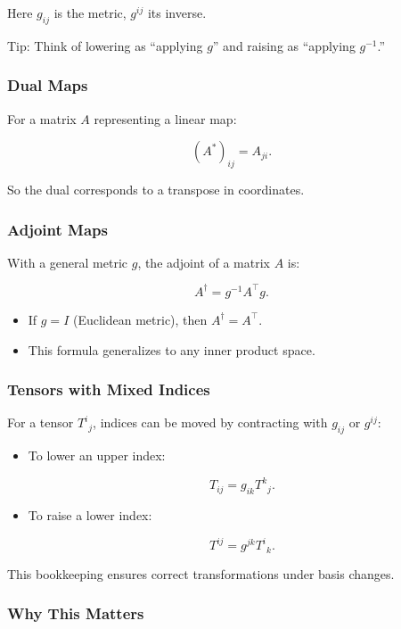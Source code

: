 \documentclass[
  letterpaper,
  DIV=11,
  numbers=noendperiod]{scrreprt}
\providecommand{\tightlist}{%
  \setlength{\itemsep}{0pt}\setlength{\parskip}{0pt}}
\begin{document}
Here \(g_{ij}\) is the metric, \(g^{ij}\) its inverse.

Tip: Think of lowering as ``applying \(g\)'' and raising as ``applying
\(g^{-1}\).''

\subsubsection{Dual Maps}\label{dual-maps}

For a matrix \(A\) representing a linear map:

\[
(A^*)_{ij} = A_{ji}.
\]

So the dual corresponds to a transpose in coordinates.

\subsubsection{Adjoint Maps}\label{adjoint-maps}

With a general metric \(g\), the adjoint of a matrix \(A\) is:

\[
A^\dagger = g^{-1} A^\top g.
\]

\begin{itemize}
\tightlist
\item
  If \(g = I\) (Euclidean metric), then \(A^\dagger = A^\top\).
\item
  This formula generalizes to any inner product space.
\end{itemize}

\subsubsection{Tensors with Mixed
Indices}\label{tensors-with-mixed-indices}

For a tensor \(T^{i}{}_j\), indices can be moved by contracting with
\(g_{ij}\) or \(g^{ij}\):

\begin{itemize}
\item
  To lower an upper index:

  \[
  T_{ij} = g_{ik} T^k{}_j.
  \]
\item
  To raise a lower index:

  \[
  T^{ij} = g^{jk} T^i{}_k.
  \]
\end{itemize}

This bookkeeping ensures correct transformations under basis changes.

\subsubsection{Why This Matters}\label{why-this-matters-32}
\end{document}
